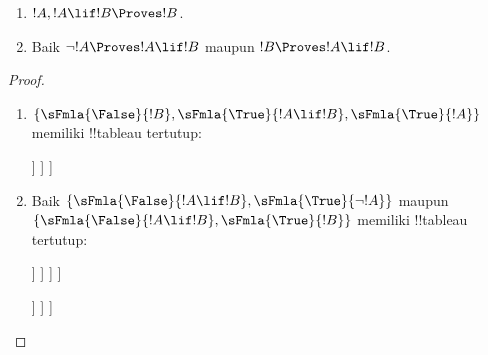 \documentclass[../../../include/open-logic-section]{subfiles}
\begin{document}
\begin{prop}
  \begin{enumerate}
  \item {} $!A, !A \lif !B \Proves !B$.
  \item {}
    Baik $\lnot !A \Proves !A \lif !B$ maupun
    $!B \Proves !A \lif !B$.
  \end{enumerate}
\end{prop}

\begin{proof}
  \begin{enumerate}
    \item $\{\sFmla{\False}{!B}, \sFmla{\True}{!A \lif !B},
      \sFmla{\True}{!A}\}$ memiliki !!{tableau} tertutup:
      \begin{oltableau}
        [\sFmla{\False}{\formula{B}}, just=\TAss
          [\sFmla{\True}{\formula{A} \lif \formula{B}}, just=\TAss
            [\sFmla{\True}{\formula{A}}, just=\TAss
              [\sFmla{\False}{\formula{A}}, just = {\TRule{\True}{\lif}[2]}, close]
              [\sFmla{\True}{\formula{B}}, just = {\TRule{\True}{\lif}[2]}, close]
            ]
          ]
        ]
      \end{oltableau}
    \item Baik $\{\sFmla{\False}{!A \lif !B},
      \sFmla{\True}{\lnot !A}\}$ maupun
      $\{\sFmla{\False}{!A \lif !B}, \sFmla{\True}{!B}\}$ memiliki
      !!{tableau} tertutup:
      \begin{oltableau}
        [\sFmla{\False}{\formula{A} \lif \formula{B}}, just = \TAss
          [\sFmla{\True}{\lnot \formula{A}}, just = \TAss
            [\sFmla{\True}{\formula{A}}, just = {\TRule{\False}{\lif}[1]}
              [\sFmla{\False}{\formula{B}}, just = {\TRule{\False}{\lif}[1]}
                [\sFmla{\False}{\formula{A}}, just = {\TRule{\True}{\lnot}[2]}, close]
              ]
            ]
          ]
        ]
      \end{oltableau}
      \begin{oltableau}
        [\sFmla{\False}{\formula{A} \lif \formula{B}}, just = \TAss
          [\sFmla{\True}{\formula{B}}, just = \TAss
            [\sFmla{\True}{\formula{A}}, just = {\TRule{\False}{\lif}[1]}
              [\sFmla{\False}{\formula{B}}, just = {\TRule{\False}{\lif}[1]},close
              ]
            ]
          ]
        ]
      \end{oltableau}
  \end{enumerate}
\end{proof}
\end{document}
